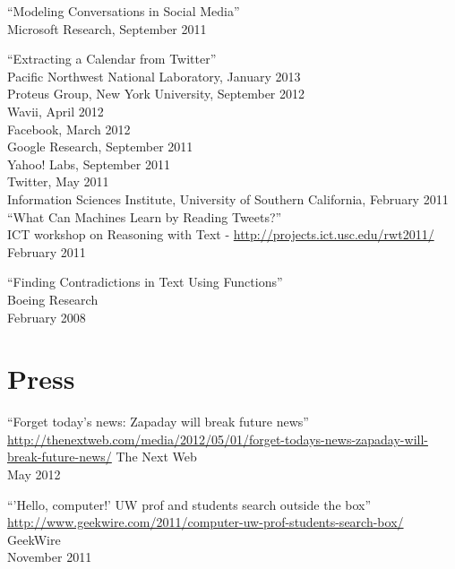 \documentclass[margin,line]{res}
\begin{document}
\begin{resume}
``Modeling Conversations in Social Media'' \\
Microsoft Research, September 2011

``Extracting a Calendar from Twitter'' \\
Pacific Northwest National Laboratory, January 2013 \\
Proteus Group, New York University, September 2012 \\
Wavii, April 2012 \\
Facebook, March 2012 \\
Google Research, September 2011 \\
Yahoo! Labs, September 2011 \\
Twitter, May 2011 \\
Information Sciences Institute, University of Southern California, February 2011 \\

``What Can Machines Learn by Reading Tweets?'' \\
ICT workshop on Reasoning with Text - \url{http://projects.ict.usc.edu/rwt2011/} \\
February 2011


%
%
``Finding Contradictions in Text Using Functions'' \\
Boeing Research \\
February 2008

\section{\sc Press}
``Forget today's news: Zapaday will break future news''\\
\url{http://thenextweb.com/media/2012/05/01/forget-todays-news-zapaday-will-break-future-news/}
The Next Web \\
May 2012

``'Hello, computer!' UW prof and students search outside the box''\\
\url{http://www.geekwire.com/2011/computer-uw-prof-students-search-box/} \\
GeekWire \\
November 2011


\end{resume}
\end{document}
